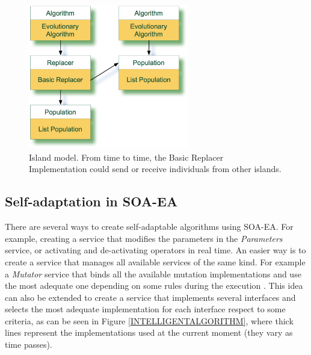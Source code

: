\begin{figure}
\centering
\includegraphics[width=7cm]{gfx/soaea/island.jpg}
\caption{Island model. From time to time, the Basic Replacer Implementation could send or receive individuals from other islands.}
\label{POPULATION}
\end{figure}



\subsection{Self-adaptation in SOA-EA}
\label{sec:otherexamples}
There are several ways to create self-adaptable algorithms using SOA-EA. For example, creating a service that modifies the parameters in the {\em Parameters} service, or activating and de-activating operators in real time. An easier way is to create a service that manages all available services of the same kind. For example a {\em Mutator} service that binds all the available mutation implementations and use the most adequate one depending on some rules during the execution \cite{SelfadaptationSerpell2010}.  This idea can also be extended to create a service that implements several interfaces and selects the most adequate implementation for each interface respect to some criteria, as can be seen in Figure \ref{INTELLIGENTALGORITHM}, where thick lines represent the implementations used at the current moment (they vary as time passes).




